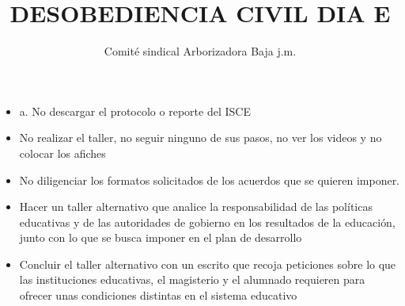 \documentclass[10pt,letterpaper]{article}
\author{Comité sindical Arborizadora Baja j.m.}
\title{DESOBEDIENCIA CIVIL DIA E}
\begin{document}
\maketitle
\begin{itemize}
\item a. No descargar el protocolo o reporte del ISCE
\item No realizar el taller, no seguir ninguno de sus pasos, no ver los videos y no colocar los afiches
\item No diligenciar los formatos solicitados de los acuerdos que se quieren imponer.
\item Hacer un taller alternativo que analice la responsabilidad de las políticas educativas y de las autoridades de gobierno en los resultados de la educación, junto con lo que se busca imponer en el plan de desarrollo
\item Concluir el taller alternativo con un escrito que recoja peticiones sobre lo que las instituciones educativas, el magisterio y el alumnado requieren para ofrecer unas condiciones distintas en el sistema educativo
\end{itemize}
\end{document}
